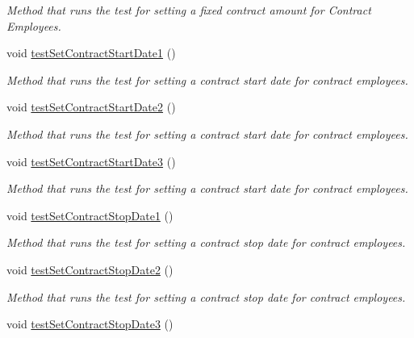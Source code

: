 \begin{DoxyCompactItemize}
\begin{DoxyCompactList}\small\item\em Method that runs the test for setting a fixed contract amount for Contract Employees. \end{DoxyCompactList}\item 
void \hyperlink{class_all_employees_test_1_1_all_employees_tests_af738dba2458a43ca7de8ecf078771ece}{test\+Set\+Contract\+Start\+Date1} ()
\begin{DoxyCompactList}\small\item\em Method that runs the test for setting a contract start date for contract employees. \end{DoxyCompactList}\item 
void \hyperlink{class_all_employees_test_1_1_all_employees_tests_a4bd1bc2a065794e29e13c418261f509f}{test\+Set\+Contract\+Start\+Date2} ()
\begin{DoxyCompactList}\small\item\em Method that runs the test for setting a contract start date for contract employees. \end{DoxyCompactList}\item 
void \hyperlink{class_all_employees_test_1_1_all_employees_tests_a14e8b9c9eb22c1139a0517079ccc6d72}{test\+Set\+Contract\+Start\+Date3} ()
\begin{DoxyCompactList}\small\item\em Method that runs the test for setting a contract start date for contract employees. \end{DoxyCompactList}\item 
void \hyperlink{class_all_employees_test_1_1_all_employees_tests_aa17d6de50125c3efe29d2ac22ab8eee4}{test\+Set\+Contract\+Stop\+Date1} ()
\begin{DoxyCompactList}\small\item\em Method that runs the test for setting a contract stop date for contract employees. \end{DoxyCompactList}\item 
void \hyperlink{class_all_employees_test_1_1_all_employees_tests_a2486c1f82d380831deb8f47ebfa971c5}{test\+Set\+Contract\+Stop\+Date2} ()
\begin{DoxyCompactList}\small\item\em Method that runs the test for setting a contract stop date for contract employees. \end{DoxyCompactList}\item 
void \hyperlink{class_all_employees_test_1_1_all_employees_tests_ab5508196541b91880c984051c977336f}{test\+Set\+Contract\+Stop\+Date3} ()

\end{DoxyCompactItemize}
